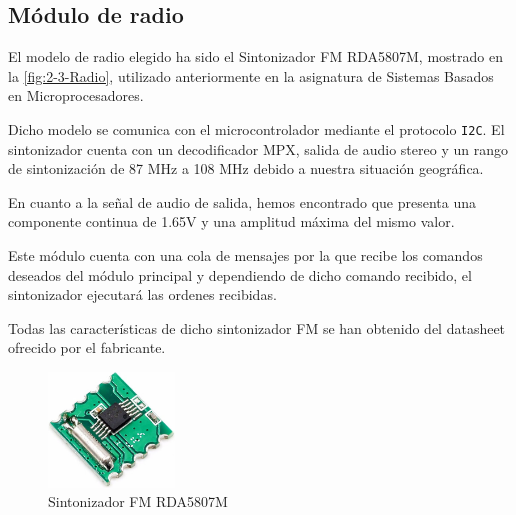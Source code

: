 \subsection{Módulo de radio}
El modelo de radio elegido ha sido el Sintonizador FM RDA5807M, mostrado en la \autoref{fig:2-3-Radio},  utilizado anteriormente en la asignatura de Sistemas Basados en Microprocesadores.

Dicho modelo se comunica con el microcontrolador mediante el protocolo \texttt{I2C}. El sintonizador cuenta con un decodificador MPX, salida de audio stereo y un rango de sintonización de 87 MHz a 108 MHz debido a nuestra situación geográfica.

En cuanto a la señal de audio de salida, hemos encontrado que presenta una componente continua de 1.65V y una amplitud máxima del mismo valor.

Este módulo cuenta con una cola de mensajes por la que recibe los comandos deseados del módulo principal y dependiendo de dicho comando recibido, el sintonizador ejecutará las ordenes recibidas.

Todas las características de dicho sintonizador FM se han obtenido del datasheet ofrecido por el fabricante.

\begin{figure}[h]
    \centering
    \includegraphics[width=0.3\textwidth]{images/2/2-3/Radio.jpg}
    \caption{Sintonizador FM RDA5807M}
    \label{fig:2-3-Radio}
\end{figure}